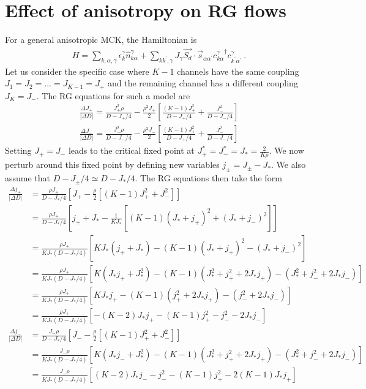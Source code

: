 \documentclass[12pt]{revtex4-2}
\begin{document}
\section{Effect of anisotropy on RG flows}
For a general anisotropic MCK, the Hamiltonian is
\begin{align}
	H = \sum_{k,\alpha,\gamma}\epsilon_{k}^\gamma \hat n^\gamma_{k\alpha} + \sum_{kk^\prime,\gamma}J_\gamma \vec{S_d}\cdot\vec{s}_{\alpha\alpha^\prime}{c^\gamma_{k\alpha}}^\dagger c^\gamma_{k^\prime\alpha^\prime}~.
\end{align}
Let us consider the specific case where \(K-1\) channels have the same coupling \(J_1 = J_2 = ... = J_{K-1} = J_+\) and the remaining channel has a different coupling \(J_K = J_-\). The RG equations for such a model are
\begin{align}
	\frac{\Delta J_+}{|\Delta D|} = \frac{J_+^2 \rho}{D - J_+/4} - \frac{\rho^2 J_+}{2}\left[\frac{(K-1)J_+^2}{D - J_+/4} + \frac{J_-^2}{D - J_-/4}\right]\\
	\frac{\Delta J_-}{|\Delta D|} = \frac{J_-^2 \rho}{D - J_-/4} - \frac{\rho^2 J_-}{2}\left[\frac{(K-1)J_+^2}{D - J_+/4} + \frac{J_-^2}{D - J_-/4}\right]
\end{align}
Setting \(J_+ = J_-\) leads to the critical fixed point at \(J_+^* = J_-^* = J_* = \frac{2}{K \rho}\). We now perturb around this fixed point by defining new variables \(j_\pm = J_\pm - J_*\). We also assume that \(D - J_\pm / 4 \simeq D - J_*/4\). The RG equations then take the form
\begin{align}
	\frac{\Delta j_+}{|\Delta D|} &= \frac{\rho J_+}{D - J_*/4}\left[J_+ - \frac{\rho}{2}\left[(K-1)J_+^2 + J_-^2\right]\right]\\
				      &= \frac{\rho J_+}{D - J_*/4}\left[j_+ + J_*- \frac{1}{K J_*}\left[(K-1)\left(J_* + j_+\right)^2 + \left(J_* + j_-\right)^2\right]\right]\\
				      &= \frac{\rho J_+}{K J_*\left(D - J_*/4\right)}\left[KJ_*\left(j_+ + J_*\right) - (K-1)\left(J_* + j_+\right)^2 - \left(J_* + j_-\right)^2\right]\\
				      &= \frac{\rho J_+}{K J_*\left(D - J_*/4\right)}\left[K\left(J_*j_+ + J_*^2\right) - (K-1)\left(J_*^2 + j_+^2 + 2J_* j_+\right) - \left(J_*^2 + j_-^2 + 2J_* j_-\right)\right]\\
				      &= \frac{\rho J_+}{K J_*\left(D - J_*/4\right)}\left[KJ_*j_+ - (K-1)\left(j_+^2 + 2J_* j_+\right) - \left(j_-^2 + 2J_* j_-\right)\right]\\
				      &= \frac{\rho J_+}{K J_*\left(D - J_*/4\right)}\left[-\left(K - 2\right)J_*j_+ - (K-1)j_+^2 - j_-^2 - 2J_* j_-\right]\\
	\frac{\Delta j_-}{|\Delta D|} &= \frac{J_- \rho}{D - J_*/4}\left[J_- - \frac{\rho}{2}\left[(K-1)J_+^2 + J_-^2\right]\right]\\
				      &= \frac{J_- \rho}{K J_*\left(D - J_*/4\right)}\left[K\left(J_*j_- + J_*^2\right) - (K-1)\left(J_*^2 + j_+^2 + 2J_* j_+\right) - \left(J_*^2 + j_-^2 + 2J_* j_-\right)\right]\\
				      &= \frac{J_- \rho}{K J_*\left(D - J_*/4\right)}\left[\left(K - 2\right)J_*j_-  - j_-^2 - (K-1)j_+^2 - 2(K-1)J_* j_+\right]\\
\end{align}
\end{document}
